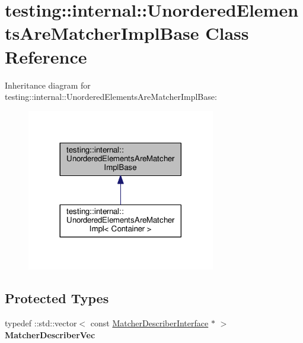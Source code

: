 \hypertarget{classtesting_1_1internal_1_1UnorderedElementsAreMatcherImplBase}{}\section{testing\+:\+:internal\+:\+:Unordered\+Elements\+Are\+Matcher\+Impl\+Base Class Reference}
\label{classtesting_1_1internal_1_1UnorderedElementsAreMatcherImplBase}


Inheritance diagram for testing\+:\+:internal\+:\+:Unordered\+Elements\+Are\+Matcher\+Impl\+Base\+:\nopagebreak
\begin{figure}[H]
\begin{center}
\leavevmode
\includegraphics[width=233pt]{classtesting_1_1internal_1_1UnorderedElementsAreMatcherImplBase__inherit__graph}
\end{center}
\end{figure}
\subsection*{Protected Types}
\begin{DoxyCompactItemize}
\item 
typedef \+::std\+::vector$<$ const \hyperlink{classtesting_1_1MatcherDescriberInterface}{Matcher\+Describer\+Interface} $\ast$ $>$ {\bfseries Matcher\+Describer\+Vec}\hypertarget{classtesting_1_1internal_1_1UnorderedElementsAreMatcherImplBase_a81ca7ce793d4b25ce2a7d3e28b48cd64}{}\label{classtesting_1_1internal_1_1UnorderedElementsAreMatcherImplBase_a81ca7ce793d4b25ce2a7d3e28b48cd64}

\end{DoxyCompactItemize}
